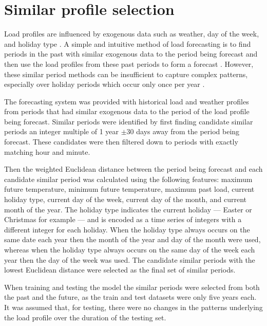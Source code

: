 \section{Similar profile selection}
Load profiles are influenced by exogenous data such as weather, day of the week, and holiday type \cite{Weron2006}.
A simple and intuitive method of load forecasting is to find periods in the past with similar exogenous data to the period being forecast and then use the load profiles from these past periods to form a forecast \cite{Senjyu1998}.
However, these similar period methods can be insufficient to capture complex patterns, especially over holiday periods which occur only once per year \cite{Chen2010}.


The forecasting system was provided with historical load and weather profiles from periods that had similar exogenous data to the period of the load profile being forecast.
Similar periods were identified by first finding candidate similar periods an integer multiple of 1 year $\pm$30 days away from the period being forecast.
These candidates were then filtered down to periods with exactly matching hour and minute.

Then the weighted Euclidean distance between the period being forecast and each candidate similar period was calculated using the following features: 
maximum future temperature, 
minimum future temperature,
maximum past load,
current holiday type, 
current day of the week,
current day of the month, and
current month of the year.
The holiday type indicates the current holiday --- Easter or Christmas for example --- and is encoded as a time series of integers with a different integer for each holiday.
When the holiday type always occurs on the same date each year then the month of the year and day of the month were used, whereas when the holiday type always occurs on the same day of the week each year then the day of the week was used.
The candidate similar periods with the lowest Euclidean distance were selected as the final set of similar periods.

When training and testing the model the similar periods were selected from both the past and the future, as the train and test datasets were only five years each.
It was assumed that, for testing, there were no changes in the patterns underlying the load profile over the duration of the testing set.

